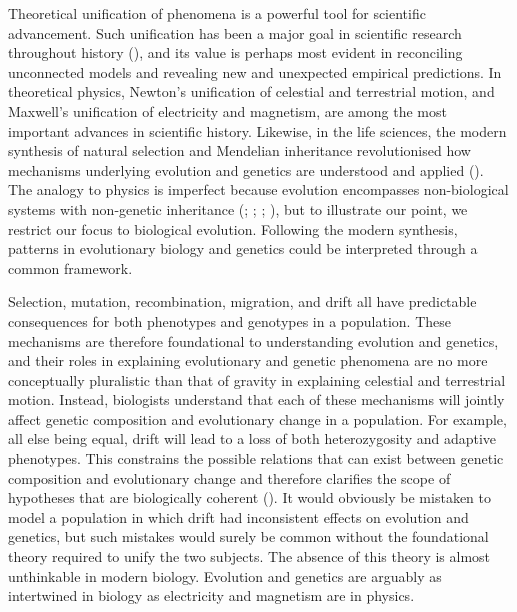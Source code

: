 \documentclass[
]{article}
\begin{document}
Theoretical unification of phenomena is a powerful tool for scientific
advancement. Such unification has been a major goal in scientific
research throughout history (),
and its value is perhaps most evident in reconciling unconnected models
and revealing new and unexpected empirical predictions. In theoretical
physics, Newton's unification of celestial and terrestrial motion, and
Maxwell's unification of electricity and magnetism, are among the most
important advances in scientific history. Likewise, in the life
sciences, the modern synthesis of natural selection and Mendelian
inheritance revolutionised how mechanisms underlying evolution and
genetics are understood and applied (). The analogy to physics is imperfect because evolution
encompasses non-biological systems with non-genetic inheritance
(;
;
;
), but to illustrate our point, we
restrict our focus to biological evolution. Following the modern
synthesis, patterns in evolutionary biology and genetics could be
interpreted through a common framework.

Selection, mutation, recombination, migration, and drift all have
predictable consequences for both phenotypes and genotypes in a
population. These mechanisms are therefore foundational to understanding
evolution and genetics, and their roles in explaining evolutionary and
genetic phenomena are no more conceptually pluralistic than that of
gravity in explaining celestial and terrestrial motion. Instead,
biologists understand that each of these mechanisms will jointly affect
genetic composition and evolutionary change in a population. For
example, all else being equal, drift will lead to a loss of both
heterozygosity and adaptive phenotypes. This constrains the possible
relations that can exist between genetic composition and evolutionary
change and therefore clarifies the scope of hypotheses that are
biologically coherent (). It
would obviously be mistaken to model a population in which drift had
inconsistent effects on evolution and genetics, but such mistakes would
surely be common without the foundational theory required to unify the
two subjects. The absence of this theory is almost unthinkable in modern
biology. Evolution and genetics are arguably as intertwined in biology
as electricity and magnetism are in physics.
\end{document}
